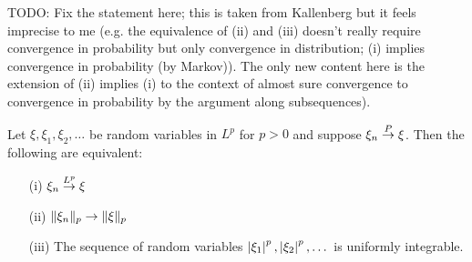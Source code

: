 TODO: Fix the statement here; this is taken from Kallenberg but it
feels imprecise to me (e.g. the equivalence of (ii) and (iii) doesn't
really require convergence in probability but only convergence in
distribution; (i) implies convergence in probability (by Markov)).
The only new content here is the extension of (ii) implies (i) to the
context of almost sure convergence to convergence in probability by
the argument along subsequences).
\begin{lem}\label{LpConvergenceUniformIntegrability}Let $\xi, \xi_1, \xi_2, \dots$ be random variables in $L^p$
  for $p > 0$ and suppose $\xi_n \overset{P}\to \xi$.  Then the following are
  equivalent:
\begin{itemize}
\item[(i)] $\xi_n \overset{L^p}\to \xi$
\item[(ii)] $\lVert \xi_n \rVert_p \to \lVert \xi \rVert_p$
\item[(iii)]The sequence of random variables $\left \vert \xi_1 \right \vert^p,
  \left \vert \xi_2 \right \vert^p, \dots$ is uniformly integrable.
\end{itemize}
\end{lem}
